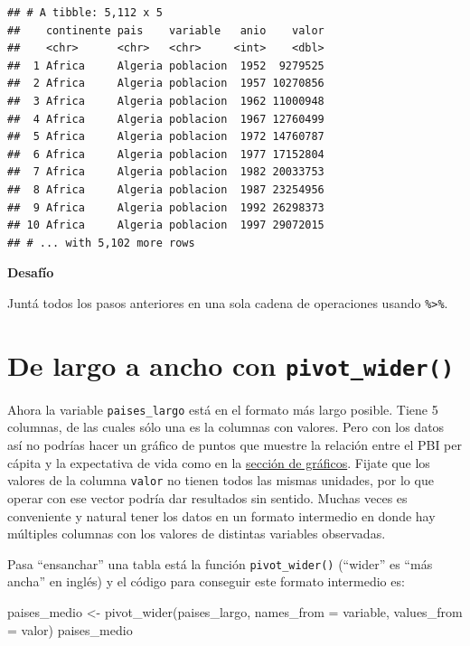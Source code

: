 \documentclass[
  openany]{book}
\newenvironment{Shaded}{\begin{snugshade}}{\end{snugshade}}
\newcommand{\AttributeTok}[1]{\textcolor[rgb]{0.77,0.63,0.00}{#1}}
\newcommand{\FunctionTok}[1]{\textcolor[rgb]{0.00,0.00,0.00}{#1}}
\newcommand{\NormalTok}[1]{#1}
\newcommand{\OtherTok}[1]{\textcolor[rgb]{0.56,0.35,0.01}{#1}}
\begin{document}
\begin{verbatim}
## # A tibble: 5,112 x 5
##    continente pais    variable   anio    valor
##    <chr>      <chr>   <chr>     <int>    <dbl>
##  1 Africa     Algeria poblacion  1952  9279525
##  2 Africa     Algeria poblacion  1957 10270856
##  3 Africa     Algeria poblacion  1962 11000948
##  4 Africa     Algeria poblacion  1967 12760499
##  5 Africa     Algeria poblacion  1972 14760787
##  6 Africa     Algeria poblacion  1977 17152804
##  7 Africa     Algeria poblacion  1982 20033753
##  8 Africa     Algeria poblacion  1987 23254956
##  9 Africa     Algeria poblacion  1992 26298373
## 10 Africa     Algeria poblacion  1997 29072015
## # ... with 5,102 more rows
\end{verbatim}

\textbf{Desafío}

Juntá todos los pasos anteriores en una sola cadena de operaciones usando \texttt{\%\textgreater{}\%}.

\hypertarget{de-largo-a-ancho-con-pivot_wider}{%
\section{\texorpdfstring{De largo a ancho con \texttt{pivot\_wider()}}{De largo a ancho con pivot\_wider()}}\label{de-largo-a-ancho-con-pivot_wider}}

Ahora la variable \texttt{paises\_largo} está en el formato más largo posible.
Tiene 5 columnas, de las cuales sólo una es la columnas con valores.
Pero con los datos así no podrías hacer un gráfico de puntos que muestre la relación entre el PBI per cápita y la expectativa de vida como en la \href{06-graficos-I.html\#Segunda_capa:_geometrías}{sección de gráficos}.
Fijate que los valores de la columna \texttt{valor} no tienen todos las mismas unidades, por lo que operar con ese vector podría dar resultados sin sentido.
Muchas veces es conveniente y natural tener los datos en un formato intermedio en donde hay múltiples columnas con los valores de distintas variables observadas.

Pasa ``ensanchar'' una tabla está la función \texttt{pivot\_wider()} (``wider'' es ``más ancha'' en inglés) y el código para conseguir este formato intermedio es:

\begin{Shaded}
\begin{Highlighting}[]
\NormalTok{paises\_medio }\OtherTok{\textless{}{-}} \FunctionTok{pivot\_wider}\NormalTok{(paises\_largo, }\AttributeTok{names\_from =}\NormalTok{ variable, }\AttributeTok{values\_from =}\NormalTok{ valor)}
\NormalTok{paises\_medio}
\end{Highlighting}
\end{Shaded}
\end{document}
